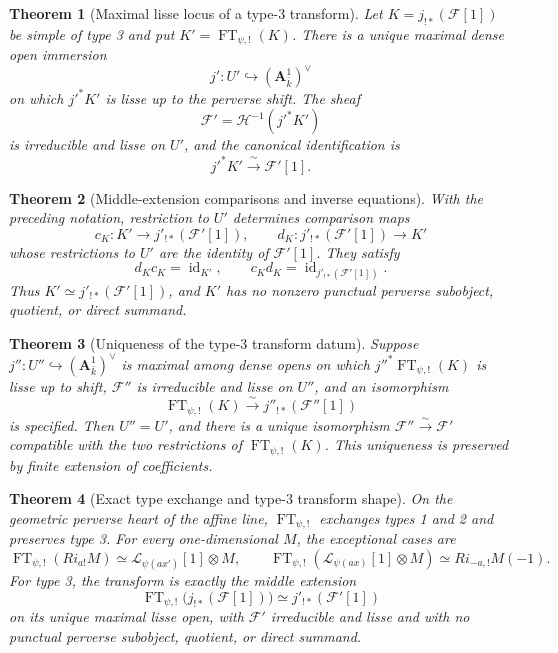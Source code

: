 \documentclass[10pt]{article}
\newtheorem{theorem}{Theorem}[section]
\theoremstyle{definition}
\newcommand{\Aone}{\mathbf A^1}
\newcommand{\FT}{\operatorname{FT}}
\begin{document}
\begin{theorem}[Maximal lisse locus of a type-3 transform]
Let \(K=j_{!*}(\mathcal F[1])\) be simple of type 3 and put
\(K'=\FT_{\psi,!}(K)\).  There is a unique maximal dense open immersion
\[
 j':U'\hookrightarrow(\Aone_{\bar k})^\vee
\]
on which \(j'^*K'\) is lisse up to the perverse shift.  The sheaf
\[
 \mathcal F'=\mathcal H^{-1}(j'^*K')
\]
is irreducible and lisse on \(U'\), and the canonical identification is
\[
 j'^*K'\xrightarrow{\ \sim\ }\mathcal F'[1].
\]
\end{theorem}

\begin{theorem}[Middle-extension comparisons and inverse equations]
With the preceding notation, restriction to \(U'\) determines comparison
maps
\[
 c_K:K'\longrightarrow j'_{!*}(\mathcal F'[1]),
 \qquad
 d_K:j'_{!*}(\mathcal F'[1])\longrightarrow K'
\]
whose restrictions to \(U'\) are the identity of \(\mathcal F'[1]\).  They
satisfy
\[
 d_Kc_K=\operatorname{id}_{K'},
 \qquad
 c_Kd_K=\operatorname{id}_{j'_{!*}(\mathcal F'[1])}.
\]
Thus \(K'\simeq j'_{!*}(\mathcal F'[1])\), and \(K'\) has no nonzero
punctual perverse subobject, quotient, or direct summand.
\end{theorem}

\begin{theorem}[Uniqueness of the type-3 transform datum]
Suppose \(j'':U''\hookrightarrow(\Aone_{\bar k})^\vee\) is maximal among
dense opens on which \(j''^*\FT_{\psi,!}(K)\) is lisse up to shift,
\(\mathcal F''\) is irreducible and lisse on \(U''\), and an isomorphism
\[
 \FT_{\psi,!}(K)\xrightarrow{\sim}j''_{!*}(\mathcal F''[1])
\]
is specified.  Then \(U''=U'\), and there is a unique isomorphism
\(\mathcal F''\xrightarrow{\sim}\mathcal F'\) compatible with the two
restrictions of \(\FT_{\psi,!}(K)\).  This uniqueness is preserved by
finite extension of coefficients.
\end{theorem}

\begin{theorem}[Exact type exchange and type-3 transform shape]
On the geometric perverse heart of the affine line, \(\FT_{\psi,!}\)
exchanges types 1 and 2 and preserves type 3.  For every one-dimensional
\(M\), the exceptional cases are
\[
 \FT_{\psi,!}(Ri_{a!}M)
   \simeq\mathcal L_{\psi(ax')}[1]\otimes M,
 \qquad
 \FT_{\psi,!}(\mathcal L_{\psi(ax)}[1]\otimes M)
   \simeq Ri_{-a,!}M(-1).
\]
For type 3, the transform is exactly the middle extension
\[
 \FT_{\psi,!}\bigl(j_{!*}(\mathcal F[1])\bigr)
 \simeq j'_{!*}(\mathcal F'[1])
\]
on its unique maximal lisse open, with \(\mathcal F'\) irreducible and
lisse and with no punctual perverse subobject, quotient, or direct summand.
\end{theorem}
\end{document}
